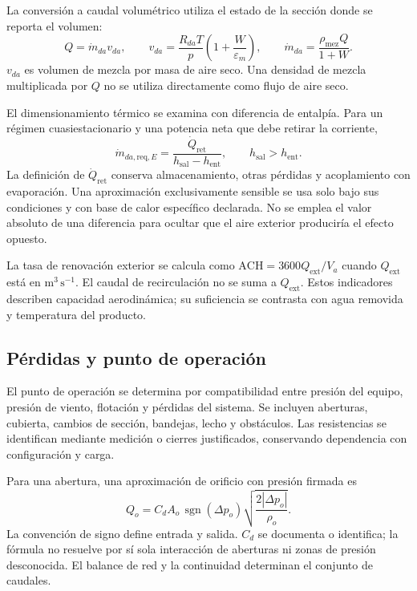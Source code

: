 La conversión a caudal volumétrico utiliza el estado de la sección donde se reporta el volumen:
\begin{equation}
Q=\dot m_{da}v_{da},
\qquad
v_{da}=\frac{R_{da}T}{p}
\left(1+\frac{W}{\varepsilon_m}\right),
\qquad
\dot m_{da}=\frac{\rho_{\mathrm{mez}}Q}{1+W}.
\label{met:conversion_caudal}
\end{equation}
$v_{da}$ es volumen de mezcla por masa de aire seco. Una densidad de mezcla multiplicada por $Q$ no se utiliza directamente como flujo de aire seco.

El dimensionamiento térmico se examina con diferencia de entalpía. Para un régimen cuasiestacionario y una potencia neta que debe retirar la corriente,
\begin{equation}
\dot m_{da,\mathrm{req},E}
=\frac{\dot Q_{\mathrm{ret}}}
{h_{\mathrm{sal}}-h_{\mathrm{ent}}},
\qquad h_{\mathrm{sal}}>h_{\mathrm{ent}}.
\label{met:caudal_requerido_energia}
\end{equation}
La definición de $\dot Q_{\mathrm{ret}}$ conserva almacenamiento, otras pérdidas y acoplamiento con evaporación. Una aproximación exclusivamente sensible se usa solo bajo sus condiciones y con base de calor específico declarada. No se emplea el valor absoluto de una diferencia para ocultar que el aire exterior produciría el efecto opuesto.

La tasa de renovación exterior se calcula como $\mathrm{ACH}=3600Q_{\mathrm{ext}}/V_a$ cuando $Q_{\mathrm{ext}}$ está en $\mathrm{m^3\,s^{-1}}$. El caudal de recirculación no se suma a $Q_{\mathrm{ext}}$. Estos indicadores describen capacidad aerodinámica; su suficiencia se contrasta con agua removida y temperatura del producto.

\subsection{Pérdidas y punto de operación}

El punto de operación se determina por compatibilidad entre presión del equipo, presión de viento, flotación y pérdidas del sistema. Se incluyen aberturas, cubierta, cambios de sección, bandejas, lecho y obstáculos. Las resistencias se identifican mediante medición o cierres justificados, conservando dependencia con configuración y carga.

Para una abertura, una aproximación de orificio con presión firmada es
\begin{equation}
Q_o=C_dA_o\,\operatorname{sgn}(\Delta p_o)
\sqrt{\frac{2|\Delta p_o|}{\rho_o}}.
\label{met:abertura_presion}
\end{equation}
La convención de signo define entrada y salida. $C_d$ se documenta o identifica; la fórmula no resuelve por sí sola interacción de aberturas ni zonas de presión desconocida. El balance de red y la continuidad determinan el conjunto de caudales.

